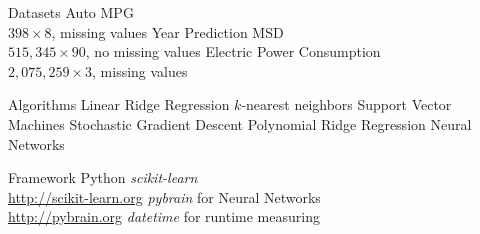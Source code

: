 \begin{frame}{Datasets}
\bs
\bi
\mi Auto MPG\\
$398\times8$, missing values
\mi Year Prediction MSD\\
$515,345\times90$, no missing values
\mi Electric Power Consumption\\
$2,075,259\times3$, missing values
\ei

\end{frame}

\begin{frame}{Algorithms}
\bs
\bi
\mi Linear Ridge Regression
\mi $k$-nearest neighbors
\mi Support Vector Machines
\mi Stochastic Gradient Descent
\ms
\mi Polynomial Ridge Regression
\mi Neural Networks
\ei
\end{frame}

\begin{frame}{Framework}
\bs
\bi
\mi Python
\mi \textit{scikit-learn}\\
\url{http://scikit-learn.org}
\mi \textit{pybrain} for Neural Networks\\
\url{http://pybrain.org}
\mi \textit{datetime} for runtime measuring
\ei
\end{frame}
